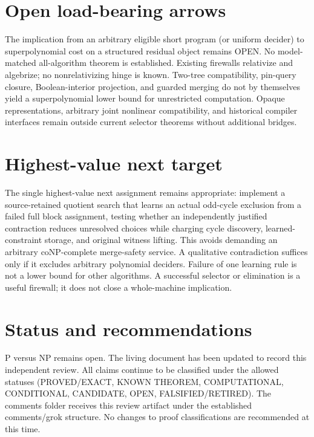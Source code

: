 \documentclass[11pt]{article}
\begin{document}
\section{Open load-bearing arrows}
The implication from an arbitrary eligible short program (or uniform decider) to superpolynomial cost on a structured residual object remains OPEN. No model-matched all-algorithm theorem is established. Existing firewalls relativize and algebrize; no nonrelativizing hinge is known. Two-tree compatibility, pin-query closure, Boolean-interior projection, and guarded merging do not by themselves yield a superpolynomial lower bound for unrestricted computation. Opaque representations, arbitrary joint nonlinear compatibility, and historical compiler interfaces remain outside current selector theorems without additional bridges.

\section{Highest-value next target}
The single highest-value next assignment remains appropriate: implement a source-retained quotient search that learns an actual odd-cycle exclusion from a failed full block assignment, testing whether an independently justified contraction reduces unresolved choices while charging cycle discovery, learned-constraint storage, and original witness lifting. This avoids demanding an arbitrary coNP-complete merge-safety service. A qualitative contradiction suffices only if it excludes arbitrary polynomial deciders. Failure of one learning rule is not a lower bound for other algorithms. A successful selector or elimination is a useful firewall; it does not close a whole-machine implication.

\section{Status and recommendations}
P versus NP remains open. The living document has been updated to record this independent review. All claims continue to be classified under the allowed statuses (PROVED/EXACT, KNOWN THEOREM, COMPUTATIONAL, CONDITIONAL, CANDIDATE, OPEN, FALSIFIED/RETIRED). The comments folder receives this review artifact under the established comments/grok structure. No changes to proof classifications are recommended at this time.

\end{document}
